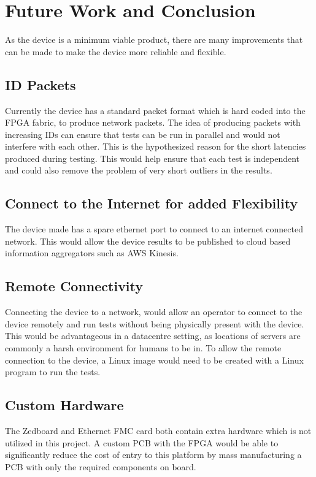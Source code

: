 \chapter{Future Work and Conclusion}\label{C:conc}

As the device is a minimum viable product, there are many improvements that can be made to make the device more 
reliable and flexible. 

\section{ID Packets}

Currently the device has a standard packet format which is hard coded into the FPGA fabric, to produce network 
packets. The idea of producing packets with increasing IDs can ensure that tests can be run in parallel and would 
not interfere with each other. This is the hypothesized reason for the short latencies produced during testing. This 
would help ensure that each test is independent and could also remove the problem of very short outliers in the 
results.

\section{Connect to the Internet for added Flexibility}

The device made has a spare ethernet port to connect to an internet connected network. This would allow the device 
results to be published to cloud based information aggregators such as AWS Kinesis.

\section{Remote Connectivity}

Connecting the device to a network, would allow an operator to connect to the device remotely and run tests without 
being physically present with the device. This would be advantageous in a datacentre setting, as locations of 
servers are commonly a harsh environment for humans to be in. To allow the remote connection to the device, a Linux 
image would need to be created with a Linux program to run the tests. 

\section{Custom Hardware}

The Zedboard and Ethernet FMC card both contain extra hardware which is not utilized in this project. A custom PCB 
with the FPGA would be able to significantly reduce the cost of entry to this platform by mass manufacturing a PCB 
with only the required components on board.

